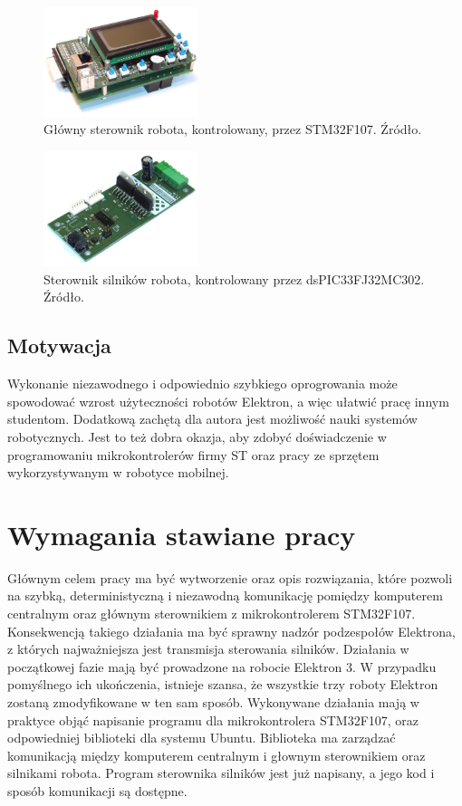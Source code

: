 \documentclass[a4paper, 12pt]{article}
\begin{document}
	\begin{figure}[ht]
	    \centering
	    \includegraphics[width=0.4\textwidth]{main}
	    \caption{Główny sterownik robota, kontrolowany, przez STM32F107. Źródło\cite{ElektronRobotyka}.}
	    \label{img:glownySterownik}
	\end{figure}
	\begin{figure}[ht]
	    \centering
	    \includegraphics[width=0.4\textwidth]{sterownik}
	    \caption{Sterownik silników robota, kontrolowany przez dsPIC33FJ32MC302. Źródło\cite{ElektronRobotyka}.}
	    \label{img:sterownikSilnikow}
	\end{figure}
	\subsection{Motywacja}
	Wykonanie niezawodnego i odpowiednio szybkiego oprogrowania może spowodować wzrost użyteczności robotów Elektron, a więc ułatwić pracę innym studentom. Dodatkową zachętą dla autora  jest możliwość nauki systemów robotycznych. Jest to też dobra okazja, aby zdobyć doświadczenie w programowaniu mikrokontrolerów firmy ST oraz pracy ze sprzętem wykorzystywanym w robotyce mobilnej. 
	\section{Wymagania stawiane pracy}
	Głównym celem pracy ma być wytworzenie oraz opis rozwiązania, które pozwoli na szybką, deterministyczną i niezawodną komunikację pomiędzy komputerem centralnym oraz głównym sterownikiem z mikrokontrolerem STM32F107. Konsekwencją takiego działania ma być sprawny nadzór podzespołów Elektrona, z których najważniejsza jest transmisja sterowania silników. Działania w początkowej fazie mają być prowadzone na robocie Elektron 3. W przypadku pomyślnego ich ukończenia, istnieje szansa, że wszystkie trzy roboty Elektron zostaną zmodyfikowane w ten sam sposób. Wykonywane działania mają w praktyce objąć napisanie programu dla mikrokontrolera STM32F107, oraz odpowiedniej biblioteki dla systemu Ubuntu. Biblioteka ma zarządzać komunikacją między komputerem centralnym i głownym sterownikiem oraz silnikami robota. Program sterownika silników jest już napisany, a jego kod i sposób komunikacji są dostępne.
\end{document}
